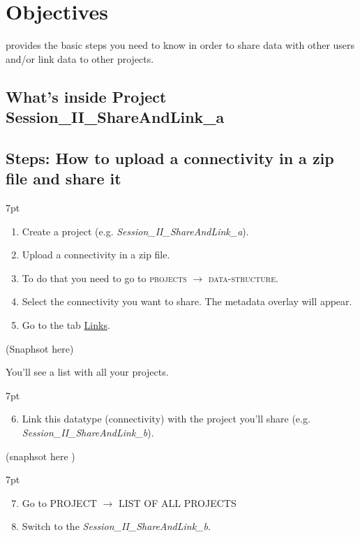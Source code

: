 \documentclass{tufte-handout}
\newenvironment{formal}{%
  \def\FrameCommand{%
    \hspace{1pt}%
    {\color{DarkBlue}\vrule width 2pt}%
    {\color{formalshade}\vrule width 4pt}%
    \colorbox{formalshade}%
  }%
  \MakeFramed{\advance\hsize-\width\FrameRestore}%
  \noindent\hspace{-4.55pt}%
  \begin{adjustwidth}{}{7pt}%
  \vspace{2pt}\vspace{2pt}%
}
{%
  \vspace{2pt}\end{adjustwidth}\endMakeFramed%
}
\begin{document}
\section{Objectives}\label{sec:objectives}

 provides the basic steps you need to know in order to
share data with other users and/or link data to other projects.


\subsection{What's inside Project Session\_II\_ShareAndLink\_a}\label{sec:project_data}

\subsection{Steps: How to upload a connectivity in a zip file and share it}\label{sec:steps}


\begin{formal}
\begin{enumerate}
\item Create a project (e.g. \textit{Session\_II\_ShareAndLink\_a}). 
\item Upload a connectivity in a zip file.
\item To do that you need to go to \textsc{projects} $\rightarrow$ \textsc{data-structure}.
\item Select the connectivity you want to share. The metadata overlay will appear.
\item Go to the tab \underline{Links}.
\end{enumerate}
\end{formal} 

(Snaphsot here)

You'll see a list with all your projects. 

\begin{formal}
\begin{enumerate}[resume]
\setcounter{enumi}{5}
\item Link this datatype (connectivity) with the project you'll share (e.g. \textit{Session\_II\_ShareAndLink\_b}).
\end{enumerate}
\end{formal} 

(snaphsot here ) 

\begin{formal}
  \begin{enumerate}[resume]
    \setcounter{enumi}{6}
    \item Go to \textsc{PROJECT} $\rightarrow$ \textsc{LIST OF ALL PROJECTS}
    \item Switch to the \textit{Session\_II\_ShareAndLink\_b}.
  \end{enumerate}
\end{formal} 
\end{document}
